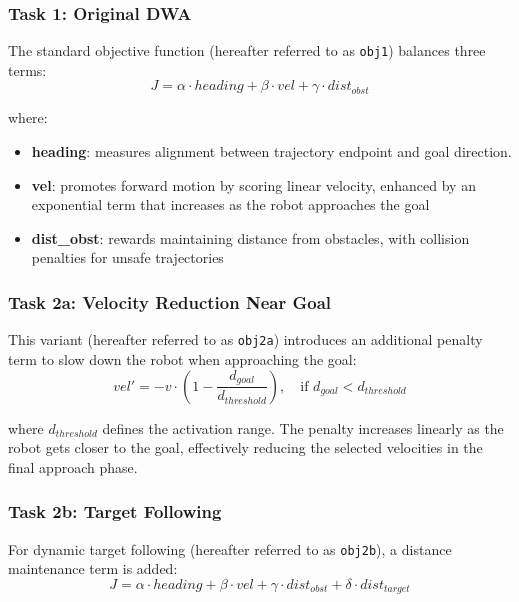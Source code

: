 \subsubsection{Task 1: Original DWA}
\label{sssec:dwa_cost}
The standard objective function (hereafter referred to as \texttt{obj1}) balances three terms:
\begin{equation}
    J = \alpha \cdot heading + \beta \cdot vel + \gamma \cdot dist_{obst}
\end{equation}

where:
\begin{itemize}
    \item \textbf{heading}: measures alignment between trajectory endpoint and goal direction.
    \item \textbf{vel}: promotes forward motion by scoring linear velocity, enhanced by an exponential term that increases as the robot approaches the goal
    \item \textbf{dist\_obst}: rewards maintaining distance from obstacles, with collision penalties for unsafe trajectories
\end{itemize}

\subsubsection{Task 2a: Velocity Reduction Near Goal}
\label{sssec:task2a}
This variant (hereafter referred to as \texttt{obj2a}) introduces an additional penalty term to slow down the robot when approaching the goal:
\begin{equation}
    vel' = -v \cdot \left(1 - \frac{d_{goal}}{d_{threshold}}\right), \quad \text{if } d_{goal} < d_{threshold}
\end{equation}

where $d_{threshold}$ defines the activation range. The penalty increases linearly as the robot gets closer to the goal, effectively reducing the selected velocities in the final approach phase.

\subsubsection{Task 2b: Target Following}
\label{sssec:task2b}
For dynamic target following (hereafter referred to as \texttt{obj2b}), a distance maintenance term is added:
\begin{equation}
    J = \alpha \cdot heading + \beta \cdot vel + \gamma \cdot dist_{obst} + \delta \cdot dist_{target}
\end{equation}

